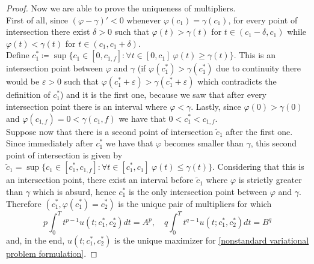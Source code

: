 \documentclass[corpo=11pt, stile=classica, tipotesi=custom,
greek, evenboxes, english]{toptesi}
\numberwithin{equation}{chapter}
\begin{document}
\begin{proof}
Now we are able to prove the uniqueness of multipliers.\\
First of all, since $(\varphi-\gamma)'<0$ whenever $\varphi(c_1) = \gamma(c_1)$, for every point of intersection there exist $\delta>0$ such that $\varphi(t) > \gamma(t)$ for $t \in (c_1 - \delta, c_1)$ while $\varphi(t) < \gamma(t)$ for $t \in (c_1, c_1 + \delta)$.\\
Define $c_1^* \coloneqq \sup \{c_1 \in [0,c_{1,f}] : \forall t \in [0,c_1] \ \varphi(t) \geq \gamma(t)\}$. This is an intersection point between $\varphi$ and $\gamma$ (if $\varphi(c_1^*) > \gamma(c_1^*)$ due to continuity there would be $\varepsilon > 0$ such that $\varphi(c_1^*+\varepsilon) > \gamma(c_1^*+\varepsilon)$ which contradicts the definition of $c_1^*$) and it is the first one, because we saw that after every intersection point there is an interval where $\varphi < \gamma$. Lastly, since $\varphi(0) > \gamma(0)$ and $\varphi(c_{1,f}) = 0 < \gamma(c_1,f)$ we have that $0 < c_1^* < c_{1,f}$.\\
Suppose now that there is a second point of intersection $\tilde{c}_1$ after the first one. Since immediately after $c_1^*$ we have that $\varphi$ becomes smaller than $\gamma$, this second point of intersection is given by $\tilde{c}_1 = \sup \{c_1 \in [c_1^*,c_{1,f}] : \forall t \in [c_1^*,c_1] \ \varphi(t) \leq \gamma(t)\}$. Considering that this is an intersection point, there exist an interval before $\tilde{c}_1$ where $\varphi$ is strictly greater than $\gamma$ which is absurd, hence $c_1^*$ is the only intersection point between $\varphi$ and $\gamma$.\\
Therefore $(c_1^*, \varphi(c_1^*) = c_2^*)$ is the unique pair of multipliers for which 
\begin{equation*}
	p\int_0^T t^{p-1} u(t;c_1^*,c_2^*)dt = A^p, \quad q\int_0^T t^{q-1} u(t;c_1^*,c_2^*)dt = B^q
\end{equation*}
and, in the end, $u(t;c_1^*,c_2^*)$ is the unique maximizer for \eqref{nonstandard variational problem formulation}.
\end{proof}

\nocite{*}
\printbibliography


	
\end{document}
